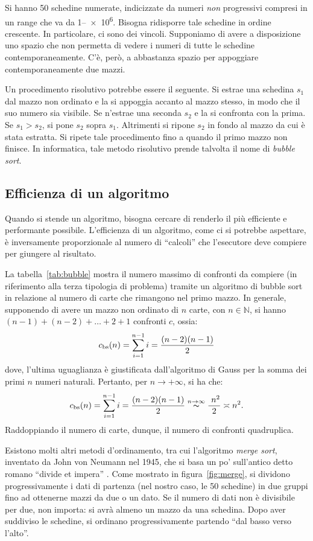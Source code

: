 Si hanno \num{50} schedine numerate, indicizzate da numeri \emph{non} progressivi compresi in un range che va da \numrange{1}{e6}. Bisogna ridisporre tale schedine in ordine crescente. In particolare, ci sono dei vincoli. Supponiamo di avere a disposizione uno spazio che non permetta di vedere i numeri di tutte le schedine contemporaneamente. C'è, però, a abbastanza spazio per appoggiare contemporaneamente due mazzi.

Un procedimento risolutivo potrebbe essere il seguente. Si estrae una schedina $s_1$ dal mazzo non ordinato e la si appoggia accanto al mazzo stesso, in modo che il suo numero sia visibile. Se n'estrae una seconda $s_2$ e la si confronta con la prima. Se $s_1>s_2$, si pone $s_2$ sopra $s_1$. Altrimenti si ripone $s_2$ in fondo al mazzo da cui è stata estratta. Si ripete tale procedimento fino a quando il primo mazzo non finisce. In informatica, tale metodo risolutivo prende talvolta il nome di \emph{bubble sort}.



		\subsection{Efficienza di un algoritmo}
		\label{subsec:eff}
Quando si stende un algoritmo, bisogna cercare di renderlo il più efficiente e performante possibile.
L'efficienza di un algoritmo, come ci si potrebbe aspettare, è inversamente proporzionale al numero di ``calcoli'' che l'esecutore deve compiere per giungere al risultato. 

La  tabella~\vref{tab:bubble} mostra il numero massimo di confronti da compiere (in riferimento alla terza tipologia di problema) tramite un algoritmo di bubble sort in relazione al numero di carte che rimangono nel primo mazzo. In generale, supponendo di avere un mazzo non ordinato di $n$ carte, con $n\in\mathbb{N}$, si hanno $(n-1)+(n-2)+\dots+2+1$ confronti $c$, ossia:
\[
c_\textup{bs}(n)=\sum_{i=1}^{n-1}i=\frac{(n-2)(n-1)}{2}
\]
dove, l'ultima uguaglianza è giustificata dall'algoritmo di Gauss per la somma dei primi $n$ numeri naturali. Pertanto, per $n\to+\infty$, si ha che:
\[
c_\textup{bs}(n)
= \sum_{i=1}^{n-1}i=\frac{(n-2)(n-1)}{2}
\overset{n\to\infty}{\thicksim}
\frac{\ n^2}{2}\asymp n^{2}.
\]
Raddoppiando il numero di carte, dunque, il numero di confronti quadruplica.

Esistono  molti altri metodi d'ordinamento, tra cui l'algoritmo \emph{merge sort}, inventato da John von Neumann nel 1945, che si basa un po' sull'antico detto romano ``divide et impera'' \parencite{wiki:it}.
Come mostrato in figura~\ref{fig:merge}, si dividono progressivamente i dati di partenza (nel nostro caso, le \num{50} schedine) in due gruppi fino ad ottenerne mazzi da due o un dato.
Se il numero di dati non è divisibile per due, non importa: si avrà almeno un mazzo da una schedina.
Dopo aver suddiviso le schedine, si ordinano progressivamente partendo ``dal basso verso l'alto''.

